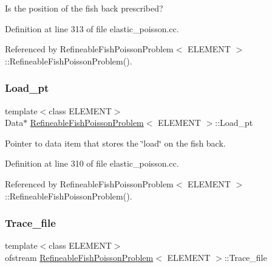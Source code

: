 Is the position of the fish back prescribed? 



Definition at line 313 of file elastic\+\_\+poisson.\+cc.



Referenced by Refineable\+Fish\+Poisson\+Problem$<$ E\+L\+E\+M\+E\+N\+T $>$\+::\+Refineable\+Fish\+Poisson\+Problem().

\mbox{\label{classRefineableFishPoissonProblem_ae4a4e592320bbe9bfbee52be7dfecfaa}} 
\subsubsection{\texorpdfstring{Load\+\_\+pt}{Load\_pt}}
{\footnotesize\ttfamily template$<$class E\+L\+E\+M\+E\+NT$>$ \\
Data$\ast$ \hyperlink{classRefineableFishPoissonProblem}{Refineable\+Fish\+Poisson\+Problem}$<$ E\+L\+E\+M\+E\+NT $>$\+::Load\+\_\+pt\hspace{0.3cm}{\ttfamily [private]}}



Pointer to data item that stores the \char`\"{}load\char`\"{} on the fish back. 



Definition at line 310 of file elastic\+\_\+poisson.\+cc.



Referenced by Refineable\+Fish\+Poisson\+Problem$<$ E\+L\+E\+M\+E\+N\+T $>$\+::\+Refineable\+Fish\+Poisson\+Problem().

\mbox{\label{classRefineableFishPoissonProblem_aa358e2b0fa91780bdca32ae4676717ff}} 
\subsubsection{\texorpdfstring{Trace\+\_\+file}{Trace\_file}}
{\footnotesize\ttfamily template$<$class E\+L\+E\+M\+E\+NT$>$ \\
ofstream \hyperlink{classRefineableFishPoissonProblem}{Refineable\+Fish\+Poisson\+Problem}$<$ E\+L\+E\+M\+E\+NT $>$\+::Trace\+\_\+file\hspace{0.3cm}{\ttfamily [private]}}



